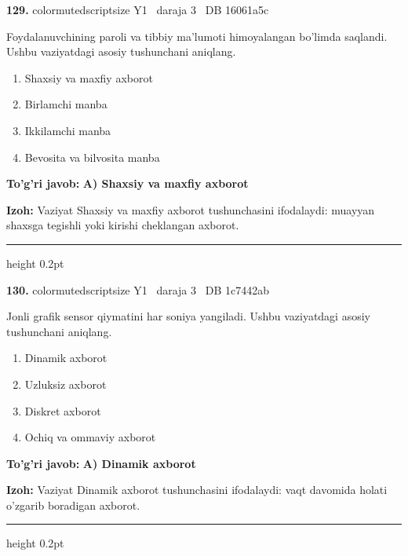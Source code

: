 \documentclass[10pt,a4paper,oneside]{article}
\begin{document}
\noindent\textbf{\color{ink}129.}  {color{muted}scriptsize Y1 \textbullet\ daraja 3 \textbullet\ DB 16061a5c}
\par
Foydalanuvchining paroli va tibbiy ma'lumoti himoyalangan bo'limda saqlandi. Ushbu vaziyatdagi asosiy tushunchani aniqlang.
\begin{enumerate}[label=\Alph*),leftmargin=9mm]
\item Shaxsiy va maxfiy axborot
\item Birlamchi manba
\item Ikkilamchi manba
\item Bevosita va bilvosita manba
\end{enumerate}
\begin{tcolorbox}[enhanced,breakable,colback=teal!4,colframe=teal!50!black,boxrule=0.5pt,arc=1.1mm,left=3mm,right=3mm,top=1.7mm,bottom=1.7mm,before skip=2mm,after skip=2mm]
\textbf{\color{teal}To'g'ri javob:} \textbf{A) Shaxsiy va maxfiy axborot}
\par\smallskip
\textbf{Izoh:} Vaziyat Shaxsiy va maxfiy axborot tushunchasini ifodalaydi: muayyan shaxsga tegishli yoki kirishi cheklangan axborot.
\end{tcolorbox}
\vspace{2mm}\hrule height 0.2pt \vspace{3mm}

\noindent\textbf{\color{ink}130.}  {color{muted}scriptsize Y1 \textbullet\ daraja 3 \textbullet\ DB 1c7442ab}
\par
Jonli grafik sensor qiymatini har soniya yangiladi. Ushbu vaziyatdagi asosiy tushunchani aniqlang.
\begin{enumerate}[label=\Alph*),leftmargin=9mm]
\item Dinamik axborot
\item Uzluksiz axborot
\item Diskret axborot
\item Ochiq va ommaviy axborot
\end{enumerate}
\begin{tcolorbox}[enhanced,breakable,colback=teal!4,colframe=teal!50!black,boxrule=0.5pt,arc=1.1mm,left=3mm,right=3mm,top=1.7mm,bottom=1.7mm,before skip=2mm,after skip=2mm]
\textbf{\color{teal}To'g'ri javob:} \textbf{A) Dinamik axborot}
\par\smallskip
\textbf{Izoh:} Vaziyat Dinamik axborot tushunchasini ifodalaydi: vaqt davomida holati o'zgarib boradigan axborot.
\end{tcolorbox}
\vspace{2mm}\hrule height 0.2pt \vspace{3mm}
\end{document}
